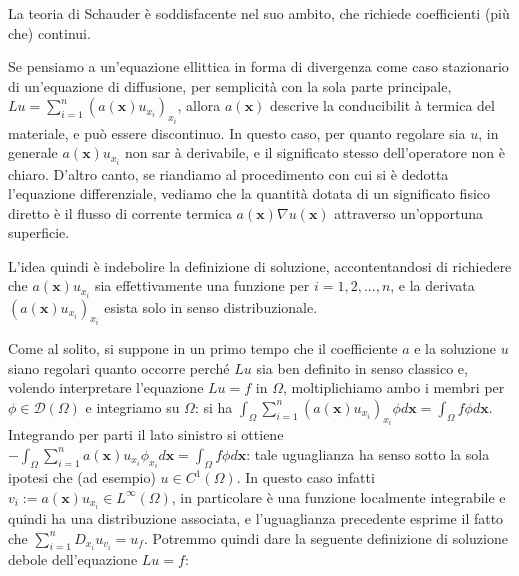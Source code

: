 \documentclass{article}
\begin{document}
La teoria di Schauder \`{e} soddisfacente nel suo ambito, che richiede
coefficienti (pi\`{u} che) continui.

Se pensiamo a un'equazione ellittica in forma di divergenza come caso
stazionario di un'equazione di diffusione, per semplicit\`{a} con la sola
parte principale, $Lu=\sum_{i=1}^{n}\left( a\left( \mathbf{x}\right)
u_{x_{i}}\right) _{x_{i}}$, allora $a(\mathbf{x})$ descrive la conducibilit%
\`{a} termica del materiale, e pu\`{o} essere discontinuo. In questo caso,
per quanto regolare sia $u$, in generale $a(\mathbf{x})u_{x_{i}}$ non sar%
\`{a} derivabile, e il significato stesso dell'operatore non \`{e} chiaro.
D'altro canto, se riandiamo al procedimento con cui si \`{e} dedotta
l'equazione differenziale, vediamo che la quantit\`{a} dotata di un
significato fisico diretto \`{e} il flusso di corrente termica $a(\mathbf{x}%
)\nabla u(\mathbf{x})$ attraverso un'opportuna superficie.

L'idea quindi \`{e} indebolire la definizione di soluzione, accontentandosi
di richiedere che $a(\mathbf{x})u_{x_{i}}$ sia effettivamente una funzione
per $i=1,2,...,n$, e la derivata $\left( a\left( \mathbf{x}\right)
u_{x_{i}}\right) _{x_{i}}$ esista solo in senso distribuzionale.

Come al solito, si suppone in un primo tempo che il coefficiente $a$ e la
soluzione $u$ siano regolari quanto occorre perch\'{e} $Lu$ sia ben definito
in senso classico e, volendo interpretare l'equazione $Lu=f$ in $%
\Omega
$, moltiplichiamo ambo i membri per $\phi \in \mathcal{D}(%
\Omega
)$ e integriamo su $%
\Omega
$: si ha $\int_{\Omega }\sum_{i=1}^{n}\left( a\left( \mathbf{x}\right)
u_{x_{i}}\right) _{x_{i}}\phi d\mathbf{x}=\int_{\Omega }f\phi d\mathbf{x}$.
Integrando per parti il lato sinistro si ottiene $-\int_{\Omega
}\sum_{i=1}^{n}a\left( \mathbf{x}\right) u_{x_{i}}\phi _{x_{i}}d\mathbf{x}%
=\int_{\Omega }f\phi d\mathbf{x}$: tale uguaglianza ha senso sotto la sola
ipotesi che (ad esempio) $u\in C^{1}(%
\Omega
)$. In questo caso infatti $v_{i}:=a\left( \mathbf{x}\right) u_{x_{i}}\in
L^{\infty }(%
\Omega
)$, in particolare \`{e} una funzione localmente integrabile e quindi ha una
distribuzione associata, e l'uguaglianza precedente esprime il fatto che $%
\sum_{i=1}^{n}D_{x_{i}}u_{v_{i}}=u_{f}$. Potremmo quindi dare la seguente
definizione di soluzione debole dell'equazione $Lu=f$:
\end{document}
